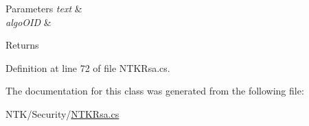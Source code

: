 \begin{DoxyParams}{Parameters}
{\em text} & \\
\hline
{\em algo\+O\+ID} & \\
\hline
\end{DoxyParams}
\begin{DoxyReturn}{Returns}

\end{DoxyReturn}


Definition at line 72 of file N\+T\+K\+Rsa.\+cs.



The documentation for this class was generated from the following file\+:\begin{DoxyCompactItemize}
\item 
N\+T\+K/\+Security/\mbox{\hyperlink{_n_t_k_rsa_8cs}{N\+T\+K\+Rsa.\+cs}}\end{DoxyCompactItemize}

